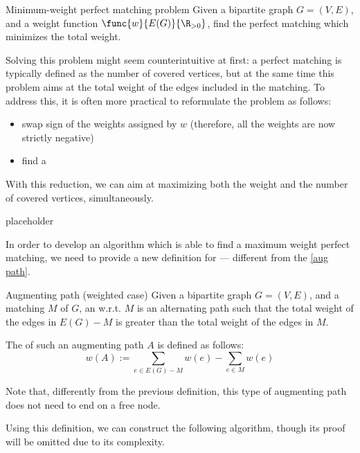 \documentclass[a4paper, 12pt]{report}
\begin{document}
    \begin{frameddefn}{Minimum-weight perfect matching problem}
        Given a bipartite graph $G = (V, E)$, and a weight function $\func{w}{E(G)}{\R_{> 0}}$, find the perfect matching which minimizes the total weight.
    \end{frameddefn}

    Solving this problem might seem counterintuitive at first: a perfect matching is typically defined as  the number of covered vertices, but at the same time this problem aims at  the total weight of the edges included in the matching. To address this, it is often more practical to reformulate the problem as follows:

    \begin{itemize}
        \item swap sign of the weights assigned by $w$ (therefore, all the weights are now strictly negative)
        \item find a 
    \end{itemize}

    With this reduction, we can aim at maximizing both the weight and the number of covered vertices, simultaneously.

    \begin{example}
        placeholder 
    \end{example}

    In order to develop an algorithm which is able to find a maximum weight perfect matching, we need to provide a new definition for  --- different from the \cref{aug path}.

    \begin{frameddefn}{Augmenting path (weighted case)}
        Given a bipartite graph $G = (V, E)$, and a matching $M$ of $G$, an  w.r.t. $M$ is an alternating path such that the total weight of the edges in $E(G) - M$ is greater than the total weight of the edges in $M$.

        The  of such an augmenting path $A$ is defined as follows: $$w(A) := \sum_{e \in E(G) - M}{w(e)} - \sum_{e \in M}{w(e)}$$
    \end{frameddefn}

    Note that, differently from the previous definition, this type of augmenting path does not need to end on a free node.

    Using this definition, we can construct the following algorithm, though its proof will be omitted due to its complexity.
\end{document}
